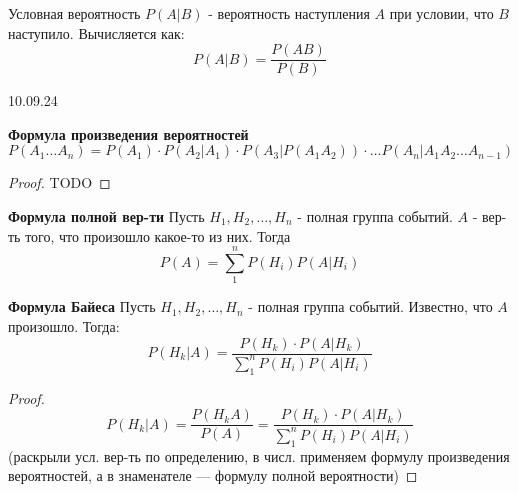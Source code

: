     \begin{opr}
        Условная вероятность \(P(A|B)\) - вероятность наступления \(A\) при условии, 
        что \(B\) наступило. Вычисляется как:
        \begin{equation}
            P(A|B) = \frac{P(AB)}{P(B)}
        \end{equation}
    \end{opr}


    \vspace{2cm}
    \begin{center}\large{10.09.24}\end{center}
    \begin{thm}
        \textbf{Формула произведения вероятностей}
        \begin{equation}
            P(A_{1}\dots A_{n}) = 
            P(A_{1})\cdot 
            P(A_{2}|A_{1})\cdot 
            P(A_{3} | P(A_{1} A_{2}))\cdot
            \dots
            P(A_{n} | A_{1}A_{2}\dots A_{n - 1})
        \end{equation}

        \begin{proof}
            TODO
        \end{proof}
    \end{thm}

    \begin{thm}
        \textbf{Формула полной вер-ти}
        Пусть \(H_{1}, H_{2}, \dots, H_{n}\) - полная группа событий. 
        \(A\) - вер-ть того, что произошло какое-то из них. Тогда
        \begin{equation}
            P(A) = \sum_{1}^{n} P(H_{i}) P(A|H_{i})
        \end{equation}
    \end{thm}


    \begin{thm}
        \textbf{Формула Байеса}
        Пусть \(H_{1}, H_{2}, \dots, H_{n}\) - полная группа событий. 
        Известно, что \(A\) произошло. Тогда:
        \begin{equation}
            P(H_{k} | A) = \frac{P(H_{k})\cdot P(A|H_{k})}{\sum_{1}^{n} P(H_{i}) P(A|H_{i})}
        \end{equation}
        \begin{proof}
            \begin{equation}
                P(H_{k} | A) = \frac{P(H_{k} A)}{P(A)} 
                = \frac{P(H_{k})\cdot P(A|H_{k})}{\sum_{1}^{n} P(H_{i}) P(A|H_{i})}
            \end{equation}
            (раскрыли усл. вер-ть по определению, в числ. применяем формулу произведения
            вероятностей, а в знаменателе — формулу полной вероятности)
        \end{proof}
    \end{thm}
